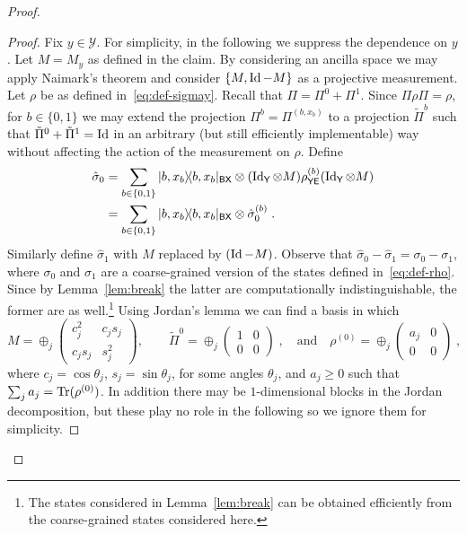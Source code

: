 \documentclass[11pt]{article}
\theoremstyle{remark}
\theoremstyle{definition}
\newcommand{\ket}[1]{|#1\rangle}
\newcommand{\bra}[1]{\langle#1|}
\newcommand{\proj}[1]{\ket{#1}\!\bra{#1}}
\newcommand{\Tr}{\mbox{\rm Tr}}
\newcommand{\Id}{\ensuremath{\mathop{\rm Id}\nolimits}}
\newcommand{\reg}[1]{{\textsf{#1}}}
\newcommand{\mY}{\ensuremath{\mathcal{Y}}}
\begin{document}
\begin{proof}
\begin{proof}
Fix $y\in \mY$. For simplicity, in the following we suppress the dependence on $y$. %
Let $M=M_y$ as defined in the claim. By considering an ancilla space we may apply Naimark's theorem and consider $\{M,\Id-M\}$ %
as a projective measurement. %
 Let $\rho$ be as defined in~\eqref{eq:def-sigmay}. Recall that $\Pi = \Pi^{0}+\Pi^1$. Since $\Pi \rho \Pi = \rho$, for $b\in\{0,1\}$ we may extend the projection $\Pi^b = \Pi^{(b,x_b)}$ to a projection $\tilde{\Pi}^b$ such that $\tilde{\Pi}^0 + \tilde{\Pi}^1 = \Id$ in an arbitrary (but still efficiently implementable) way without affecting the action of the measurement on $\rho$. %
Define
\begin{align}
\hat{\sigma}_0 &=\sum_{b\in\{0,1\}} \proj{b,x_b}_{\reg{BX}} \otimes  (\Id_\reg{Y}\otimes M) \rho^{(b)}_{\reg{YE}} (\Id_\reg{Y}\otimes M)\notag\\
 &=\sum_{b\in\{0,1\}} \proj{b,x_b}_{\reg{BX}} \otimes  \hat{\sigma}_0^{(b)}\;.\label{eq:def-hat-rho}
\end{align}
Similarly define $\hat{\sigma}_1$ with $M$ replaced by $(\Id-M)$. Observe that $\hat{\sigma}_0 - \hat{\sigma}_1 = \sigma_0-\sigma_1$, where $\sigma_0$ and $\sigma_1$ are a coarse-grained version of the states defined in~\eqref{eq:def-rho}. Since by Lemma~\ref{lem:break} the latter are computationally indistinguishable, the former are as well.\footnote{The states considered in Lemma~\ref{lem:break} can be obtained efficiently from the coarse-grained states considered here.}  Using Jordan's lemma we can find a basis in which  
\begin{equation}\label{eq:n-form}
M = \oplus_j \begin{pmatrix} c_j^2 & c_js_j \\ c_js_j & s_j^2 \end{pmatrix},\qquad \tilde{\Pi}^0 = \oplus_j \begin{pmatrix} 1 & 0 \\ 0 & 0 \end{pmatrix}\;,\quad \text{and}\quad \rho^{(0)} = \oplus_j \begin{pmatrix} a_j & 0 \\ 0 & 0 \end{pmatrix}\;,
\end{equation}
where $c_j= \cos \theta_j$, $s_j=\sin \theta_j$, for some angles $\theta_j$, and $a_j \geq 0$ such that $\sum_j a_j = \Tr(\rho^{(0)})$. In addition there may be $1$-dimensional blocks in the Jordan decomposition, but these play no role in the following so we ignore them for simplicity. 


\end{proof}
\end{proof}
\end{document}
